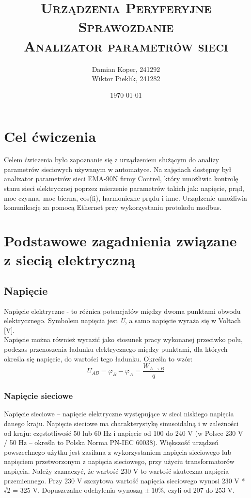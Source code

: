 \documentclass[12pt]{article}
\title{ 
    \vspace*{55mm}
    \textsc{
        \textbf{Urządzenia Peryferyjne}\\
        \large Sprawozdanie  \\
        \Large Analizator parametrów sieci
        }
}
\author{
Damian Koper,  241292\\
Wiktor Pieklik, 241282\\
}
\date{\today}
\begin{document}
\maketitle


\newpage
\setcounter{tocdepth}{2}
\localtableofcontents
\listoffigures
\lstlistoflistings

\newpage

\section{Cel ćwiczenia}
Celem ćwiczenia było zapoznanie się z urządzeniem służącym do analizy parametrów sieciowych używanym w automatyce. Na zajęciach dostępny był analizator parametrów sieci EMA-90N firmy Contrel, który umożliwia kontrolę stanu sieci elektrycznej poprzez mierzenie parametrów takich jak: napięcie, prąd, moc czynna, moc bierna, cos(fi), harmoniczne prądu i inne. Urządzenie umożliwia komunikację za pomocą Ethernet przy wykorzystaniu protokołu modbus.
\section{Podstawowe zagadnienia związane z siecią elektryczną}
\subsection{Napięcie}
Napięcie elektryczne - to różnica potencjałów między dwoma punktami obwodu elektrycznego. Symbolem napięcia jest \textit{U}, a samo napięcie wyraża się w Voltach [V].\\
Napięcie można również wyrazić jako stosunek pracy wykonanej przeciwko polu, podczas przenoszenia ładunku elektrycznego między punktami, dla których określa się napięcie, do wartości tego ładunku. Określa to wzór:\\
\begin{equation}
    U_{AB} = \varphi_B - \varphi_A = \frac{W_{A \rightarrow B}}{q}
\end{equation}
\subsubsection{Napięcie sieciowe}
Napięcie sieciowe – napięcie elektryczne występujące w sieci niskiego napięcia danego kraju. Napięcie sieciowe ma charakterystykę sinusoidalną i w zależności od kraju: częstotliwość 50 lub 60 Hz i napięcie od 100 do 240 V (w Polsce 230 V / 50 Hz – określa to Polska Norma PN-IEC 60038). Większość urządzeń powszechnego użytku jest zasilana z wykorzystaniem napięcia sieciowego lub napięciem przetworzonym z napięcia sieciowego, przy użyciu transformatorów napięcia. Należy zaznaczyć, że wartość 230 V to wartość skuteczna napięcia przemiennego. Przy 230 V szczytowa wartość napięcia sieciowego wynosi 230 V * √2 = 325 V. Dopuszczalne odchylenia wynoszą $\pm\ 10\%$, czyli od 207 do 253 V.
\end{document}
